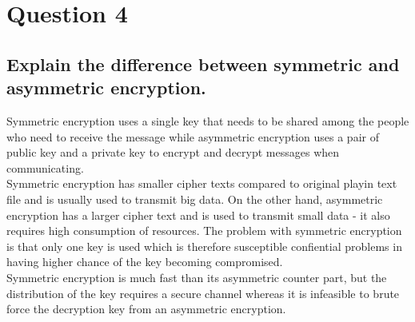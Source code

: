 \documentclass{report}
\begin{document}
	\section{Question 4}
	\startsection
		\renewcommand{\thesubsection}{\thesection.\Alph{subsection}}
		\subsection{Explain the difference between symmetric and asymmetric encryption.}
		\startsubsection
			Symmetric encryption uses a single key that needs to be shared among the people who need to receive the message while asymmetric encryption uses a pair of public key and a private key to encrypt and decrypt messages when communicating. \\
			Symmetric encryption has smaller cipher texts compared to original playin text file and is usually used to transmit big data. On the other hand, asymmetric encryption has a larger cipher text and is used to transmit small data - it also requires high consumption of resources. The problem with symmetric encryption is that only one key is used which is therefore susceptible confiential problems in having higher chance of the key becoming compromised. \\
			Symmetric encryption is much fast than its asymmetric counter part, but the distribution of the key requires a secure channel whereas it is infeasible to brute force the decryption key from an asymmetric encryption.
		\closesection
	\closesection
\end{document}
